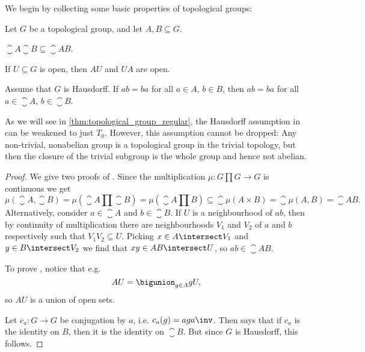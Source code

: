 \documentclass[article, a4paper, 11pt, oneside]{memoir}
\numberwithin{equation}{chapter}
\begin{document}
We begin by collecting some basic properties of topological groups:

\begin{proposition}
    Let $G$ be a topological group, and let $A, B \subseteq G$.
    \begin{enumprop}
        \item \label{enum:closure_of_product} $\closure{A} \closure{B} \subseteq \closure{AB}$.

        \item \label{enum:product_open_set} If $U \subseteq G$ is open, then $AU$ and $UA$ are open.
        
        \item \label{enum:elements-of-closure-commute} Assume that $G$ is Hausdorff. If $ab = ba$ for all $a \in A$, $b \in B$, then $ab = ba$ for all $a \in \closure{A}$, $b \in \closure{B}$.
    \end{enumprop}
\end{proposition}
%
As we will see in \cref{thm:topological_group_regular}, the Hausdorff assumption in  can be weakened to just $T_0$. However, this assumption cannot be dropped: Any non-trivial, nonabelian group is a topological group in the trivial topology, but then the closure of the trivial subgroup is the whole group and hence not abelian.

\begin{proof}
    We give two proofs of . Since the multiplication $\mu \colon G \prod G \to G$ is continuous we get
    \begin{equation*}
        \mu(\closure{A}, \closure{B})
            = \mu(\closure{A} \prod \closure{B})
            = \mu(\closure{A \prod B})
            \subseteq \closure{\mu(A \times B)}
            = \closure{\mu(A, B)}
            = \closure{AB}.
    \end{equation*}
    Alternatively, consider $a \in \closure{A}$ and $b \in \closure{B}$. If $U$ is a neighbourhood of $ab$, then by continuity of multiplication there are neighbourhoods $V_1$ and $V_2$ of $a$ and $b$ respectively such that $V_1 V_2 \subseteq U$. Picking $x \in A \intersect V_1$ and $y \in B \intersect V_2$ we find that $xy \in AB \intersect U$, so $ab \in \closure{AB}$.

    To prove , notice that e.g.
    \begin{equation*}
        AU = \bigunion_{g \in A} gU,
    \end{equation*}
    so $AU$ is a union of open sets.

    Let $c_a \colon G \to G$ be conjugation by $a$, i.e. $c_a(g) = aga\inv$. Then  says that if $c_a$ is the identity on $B$, then it is the identity on $\closure{B}$. But since $G$ is Hausdorff, this follows.
\end{proof}
\end{document}
